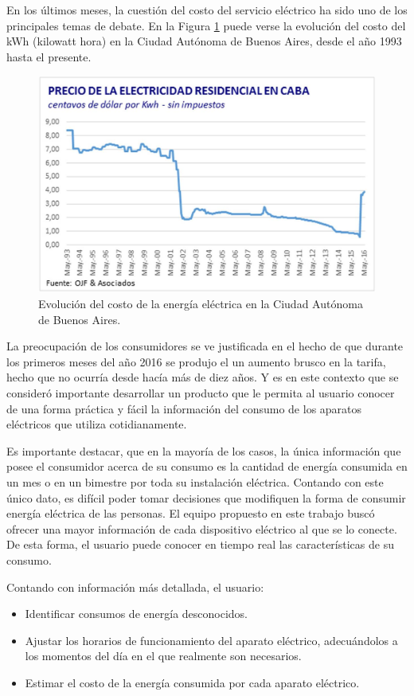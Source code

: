 En los últimos meses, la cuestión del costo del servicio eléctrico ha sido uno de los principales temas de debate. En la Figura \ref{fig:costo_caba} puede verse la evolución del costo del kWh (kilowatt hora) en la Ciudad Autónoma de Buenos Aires, desde el año 1993 hasta el presente.

\begin{figure}[h]
	\centering
	\includegraphics[width=12cm]{./Figures/1_1_costo_electricidad_caba.png}
	\caption{Evolución del costo de la energía eléctrica en la Ciudad Autónoma de Buenos Aires.}
	\label{fig:costo_caba}
\end{figure}

La preocupación de los consumidores se ve justificada en el hecho de que durante los primeros meses del año 2016 se produjo el un aumento brusco en la tarifa, hecho que no ocurría desde hacía más de diez años. Y es en este contexto que se consideró importante desarrollar un producto que le permita al usuario conocer de una forma práctica y fácil la información del consumo de los aparatos eléctricos que utiliza cotidianamente. 

Es importante destacar, que en la mayoría de los casos, la única información que posee el consumidor acerca de su consumo es la cantidad de energía consumida en un mes o en un bimestre por toda su instalación eléctrica. Contando con este único dato, es difícil poder tomar decisiones que modifiquen la forma de consumir energía eléctrica de las personas. El equipo propuesto en este trabajo buscó ofrecer una mayor información de cada dispositivo eléctrico al que se lo conecte. De esta forma, el usuario puede conocer en tiempo real las características de su consumo.

Contando con información más detallada, el usuario:
\begin{itemize}
\item Identificar consumos de energía desconocidos.
\item Ajustar los horarios de funcionamiento del aparato eléctrico, adecuándolos a los momentos del día en el que realmente son necesarios.
\item Estimar el costo de la energía consumida por cada aparato eléctrico.
\end{itemize}

